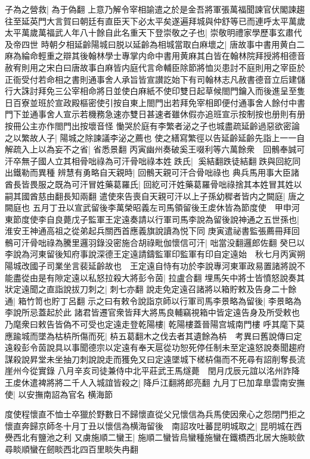 子為之營救|{
	為于偽翻}
上意乃解令宰相諭遣之於是金吾將軍張萬福聞諫官伏閣諫趨往至延英門大言賀曰朝廷有直臣天下必太平矣遂遍拜城與仲舒等已而連呼太平萬歲太平萬歲萬福武人年八十餘自此名重天下登崇敬之子也|{
	崇敬明禮家學歷事玄肅代及帝四世}
時朝夕相延齡陽城曰脱以延齡為相城當取白麻壞之|{
	唐故事中書用黄白二麻為綸命輕重之辯其後翰林學士專掌内命中書用黄麻其白皆在翰林院拜授將相德音赦宥則用之宋白曰唐故事白麻皆内庭代言命輔臣除節將恤災患討不庭則用之宰臣於正衙受付若命相之書則通事舍人承旨皆宣讃訖始下有司翰林志凡赦書德音立后建儲行大誅討拜免三公宰相命將日並使白麻紙不使印雙日起草候閤門鑰入而後進呈至隻日百寮並班於宣政殿樞密使引按自東上閤門出若拜免宰相即便付通事舍人餘付中書門下並通事舍人宣示若機務急速亦雙日甚速者雖休假亦追班宣示按制按也册則有册按冊公主亦作閤門出按壞音怪}
慟哭於庭有李繁者泌之子也城盡疏延齡過惡欲密論之以繁故人子|{
	陽城之除諫議李泌之薦也}
使之繕寫繁徑以告延齡延齡先詣上一一自解疏入上以為妄不之省|{
	省悉景翻}
丙寅幽州奏破奚王啜利等六萬餘衆　回鶻奉誠可汗卒無子國人立其相骨咄祿為可汗骨咄祿本姓跌氏|{
	奚結翻跌徒結翻跌與回紇同出鐵勒而異種}
辨慧有勇略自天親時|{
	回鶻天親可汗合骨咄祿也}
典兵馬用事大臣諸酋長皆畏服之既為可汗冒姓藥葛羅氏|{
	回紇可汗姓藥葛羅骨咄祿捨其本姓冒其姓以嗣其國酋慈由翻長知兩翻}
遣使來告喪自天親可汗以上子孫幼穉者皆内之闕庭|{
	唐之闕庭也}
五月丁丑以宣武留後李萬榮昭義左司馬領留後王䖍休皆為節度使　甲申河東節度使李自良薨戊子監軍王定遠奏請以行軍司馬李說為留後說神通之五世孫也|{
	淮安王神通高祖之從弟起兵關西首應義旗說讀為悦下同}
庚寅遣祕書監張薦冊拜回鶻可汗骨咄祿為騰里邏羽錄没密施合胡祿毗伽懷信可汗|{
	咄當没翻邏郎佐翻}
癸巳以李說為河東留後知府事說深德王定遠請鑄監軍印監軍有印自定遠始　秋七月丙寅朔陽城改國子司業坐言裴延齡故也　王定遠自恃有功於李說專河東軍政易置諸將說不能盡從由是有隙定遠以私怒拉殺大將彭令茵|{
	拉盧合翻}
埋馬矢中將士皆憤怒說奏其狀定遠聞之直詣說拔刀刺之|{
	刺七亦翻}
說走免定遠召諸將以箱貯敕及告身二十餘通|{
	箱竹笥也貯丁呂翻}
示之曰有敕令說詣京師以行軍司馬李景略為留後|{
	李景略為李說所忌蓋起於此}
諸君皆遷官衆皆拜大將馬良輔竊視箱中皆定遠告身及所受敕也乃麾衆曰敕告皆偽不可受也定遠走登乾陽樓|{
	乾陽樓蓋晉陽宫城南門樓}
呼其麾下莫應踰城而墜為枯枿所傷而死|{
	枿五葛翻木之伐去者其遺餘為枿　考異曰舊說傳曰定遠殺彭令茵說具以事聞德宗以定遠有奉天扈從功恕死停任制未至定遠怒說奏聞趨府謀殺說昇堂未坐抽刀刺說說走而獲免又曰定遠墜城下槎枿傷而不死尋有詔削奪長流崖州今從實錄}
八月辛亥司徒兼侍中北平莊武王馬燧薨　閏月戊辰元誼以洺州詐降王䖍休遣裨將將二千人入城誼皆殺之|{
	降戶江翻將郎亮翻}
九月丁巳加韋臯雲南安撫使|{
	以安撫南詔為官名}
横海節

度使程懷直不恤士卒獵於野數日不歸懷直從父兄懷信為兵馬使因衆心之怨閉門拒之懷直奔歸京師冬十月丁丑以懷信為横海留後　南詔攻吐蕃昆明城取之|{
	昆明城在西㸑西北有鹽池之利}
又虜施順二蠻王|{
	施順二蠻皆烏蠻種施蠻在鐵橋西北居大施睒歛尋睒順蠻在劒睒西北四百里睒失冉翻}


